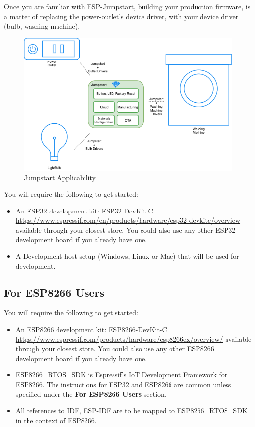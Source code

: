 \documentclass[main.tex]{subfiles}
\begin{document}
Once you are familiar with ESP-Jumpstart, building your production firmware, is a matter of replacing the power-outlet's device driver, with your device driver (bulb, washing machine).

\begin{figure}[h!]
    \centering
    \includegraphics[scale=0.7]{../../_static/jumpstart-outlet-blocks.png}
    \caption{Jumpstart Applicability}
    \label{fig:jumpstart_applicability}
\end{figure}

You will require the following to get started:
\begin{itemize}
\item An ESP32 development kit: ESP32-DevKit-C \url{https://www.espressif.com/en/products/hardware/esp32-devkitc/overview} available through your closest store. You could also use any other ESP32 development board if you already have one.
\item A Development host setup (Windows, Linux or Mac) that will be used for development.
\end{itemize}

\subsection{For ESP8266 Users}\label{sec:for_esp8266_users}
You will require the following to get started:
\begin{itemize}
\item An ESP8266 development kit: ESP8266-DevKit-C \url{https://www.espressif.com/products/hardware/esp8266ex/overview/} available through your closest store. You could also use any other ESP8266 development board if you already have one.
\item ESP8266\_RTOS\_SDK is Espressif’s IoT Development Framework for ESP8266. The instructions for ESP32 and ESP8266 are common unless specified under the \textbf{For ESP8266 Users} section.
\item All references to IDF, ESP-IDF are to be mapped to ESP8266\_RTOS\_SDK in the context of ESP8266.
\end{itemize}
\end{document}
